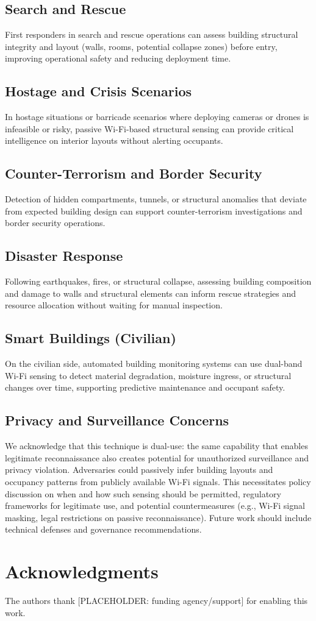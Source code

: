 \documentclass[conference]{IEEEtran}
\begin{document}
\subsection*{Search and Rescue}
First responders in search and rescue operations can assess building structural integrity and layout (walls, rooms, potential collapse zones) before entry, improving operational safety and reducing deployment time.

\subsection*{Hostage and Crisis Scenarios}
In hostage situations or barricade scenarios where deploying cameras or drones is infeasible or risky, passive Wi-Fi-based structural sensing can provide critical intelligence on interior layouts without alerting occupants.

\subsection*{Counter-Terrorism and Border Security}
Detection of hidden compartments, tunnels, or structural anomalies that deviate from expected building design can support counter-terrorism investigations and border security operations.

\subsection*{Disaster Response}
Following earthquakes, fires, or structural collapse, assessing building composition and damage to walls and structural elements can inform rescue strategies and resource allocation without waiting for manual inspection.

\subsection*{Smart Buildings (Civilian)}
On the civilian side, automated building monitoring systems can use dual-band Wi-Fi sensing to detect material degradation, moisture ingress, or structural changes over time, supporting predictive maintenance and occupant safety.

\subsection*{Privacy and Surveillance Concerns}
We acknowledge that this technique is dual-use: the same capability that enables legitimate reconnaissance also creates potential for unauthorized surveillance and privacy violation. Adversaries could passively infer building layouts and occupancy patterns from publicly available Wi-Fi signals. This necessitates policy discussion on when and how such sensing should be permitted, regulatory frameworks for legitimate use, and potential countermeasures (e.g., Wi-Fi signal masking, legal restrictions on passive reconnaissance). Future work should include technical defenses and governance recommendations.

\section*{Acknowledgments}

The authors thank [PLACEHOLDER: funding agency/support] for enabling this work.



\end{document}

